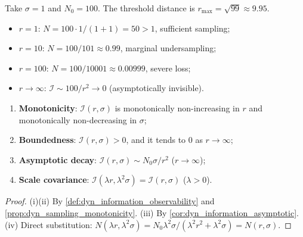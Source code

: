 \begin{example}[Numerical example: $\sigma=1$, $N_0=100$]\label{ex:dyn_information_numeric}
Take $\sigma=1$ and $N_0=100$. The threshold distance is $r_{\max}=\sqrt{99}\approx 9.95$.
\begin{itemize}
    \item $r=1$: $N=100\cdot 1/(1+1)=50>1$, sufficient sampling;
    \item $r=10$: $N=100/101\approx 0.99$, marginal undersampling;
    \item $r=100$: $N=100/10001\approx 0.00999$, severe loss;
    \item $r\to\infty$: $\mathcal I\sim 100/r^2\to 0$ (asymptotically invisible).
\end{itemize}
\end{example}

\begin{property}\label{prop:dyn_information_properties}
\leavevmode
\begin{enumerate}[label=(\roman*)]
    \item \textbf{Monotonicity}: $\mathcal I(r,\sigma)$ is monotonically non-increasing in $r$ and monotonically non-decreasing in $\sigma$;
    \item \textbf{Boundedness}: $\mathcal I(r,\sigma)>0$, and it tends to $0$ as $r\to\infty$;
    \item \textbf{Asymptotic decay}: $\mathcal I(r,\sigma)\sim N_0\sigma/r^2$ ($r\to\infty$);
    \item \textbf{Scale covariance}: $\mathcal I(\lambda r,\lambda^2\sigma)=\mathcal I(r,\sigma)$ ($\lambda>0$).
\end{enumerate}
\end{property}

\begin{proof}
(i)(ii) By \cref{def:dyn_information_observability} and \cref{prop:dyn_sampling_monotonicity}. (iii) By \cref{cor:dyn_information_asymptotic}. (iv) Direct substitution: $N(\lambda r,\lambda^2\sigma)=N_0\lambda^2\sigma/(\lambda^2r^2+\lambda^2\sigma)=N(r,\sigma)$.
\end{proof}

